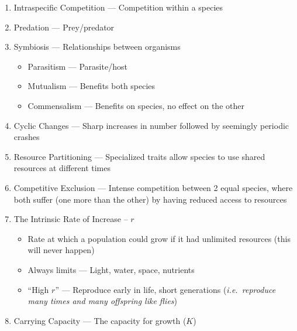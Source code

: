 \documentclass[12pt]{article}
\begin{document}
\begin{enumerate}
  \item Intraspecific Competition — Competition within a species

  \item Predation — Prey/predator

  \item Symbiosis — Relationships between organisms

    \begin{itemize}

      \item Parasitism — Parasite/host

      \item Mutualism — Benefits both species

      \item Commensalism — Benefits on species, no effect on the other

    \end{itemize}

  \item Cyclic Changes — Sharp increases in number followed by seemingly periodic crashes

  \item Resource Partitioning — Specialized traits allow species to use shared resources at different times

  \item Competitive Exclusion — Intense competition between 2 equal species, where both suffer (one more than the other) by having reduced access to resources

  \item The Intrinsic Rate of Increase – $r$

    \begin{itemize}

      \item Rate at which a population could grow if it had unlimited resources (this will never happen)

      \item Always limits — Light, water, space, nutrients

      \item “High $r$” — Reproduce early in life, short generations (\textit{i.e.\ reproduce many times and many offspring like flies})

    \end{itemize}

  \item Carrying Capacity — The capacity for growth ($K$)


\end{enumerate}
\end{document}
